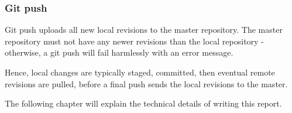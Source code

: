 \subsubsection*{Git push}
Git push uploads all new local revisions to the master repository. The master repository must
not have any newer revisions than the local repository - otherwise, a git push will fail
harmlessly with an error message.

Hence, local changes are typically staged, committed, then eventual remote revisions are pulled,
before a final push sends the local revisions to the master.

The following chapter will explain the technical details of writing this report.
